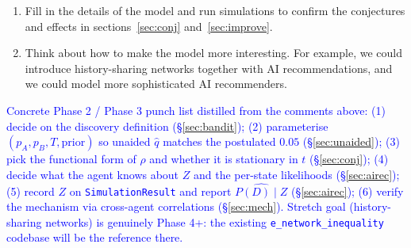 \documentclass[12pt]{article}
\newcommand{\ignacio}[1]{\textcolor{blue}{#1}}
\begin{document}
\begin{enumerate}[leftmargin=*]
  \item Fill in the details of the model and run simulations to confirm the conjectures and effects in sections~\ref{sec:conj} and~\ref{sec:improve}.
  \item Think about how to make the model more interesting.
    For example, we could introduce history-sharing networks together with AI recommendations, and we could model more sophisticated AI recommenders.
\end{enumerate}

\ignacio{Concrete Phase 2 / Phase 3 punch list distilled from the comments above: (1) decide on the discovery definition (\S\ref{sec:bandit}); (2) parameterise $(p_A, p_B, T, \text{prior})$ so unaided $\hat q$ matches the postulated $0.05$ (\S\ref{sec:unaided}); (3) pick the functional form of $\rho$ and whether it is stationary in $t$ (\S\ref{sec:conj}); (4) decide what the agent knows about $Z$ and the per-state likelihoods (\S\ref{sec:airec}); (5) record $Z$ on \texttt{SimulationResult} and report $\widehat{P(D) \mid Z}$ (\S\ref{sec:airec}); (6) verify the mechanism via cross-agent correlations (\S\ref{sec:mech}). Stretch goal (history-sharing networks) is genuinely Phase 4+: the existing \texttt{e\_network\_inequality} codebase will be the reference there.}
\end{document}
